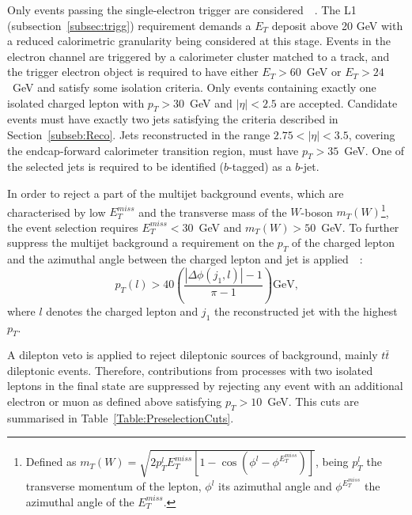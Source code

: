 Only events passing the single-electron trigger are considered~\cite{Aad:2014sca}~\cite{Aaboud:2016ymp}. The L1 (subsection~\ref{subsec:trigg}) requirement demands a $E_T$ deposit above 20 GeV with a reduced calorimetric granularity being considered at this stage. Events in the electron channel are triggered by a calorimeter cluster matched to a track, and the trigger electron object is required to have either $E_T >60$~GeV or $E_T >24$~GeV and satisfy some isolation criteria. Only events containing exactly one isolated charged lepton with $p_T > 30$~GeV and $|\eta|<2.5$ are accepted. Candidate events must have exactly two jets satisfying the criteria described in Section~\ref{subseb:Reco}. Jets reconstructed in the range $2.75<|\eta|<3.5$, covering the endcap-forward calorimeter transition region, must have $p_T > 35$~GeV. One of the selected jets is required to be identified ($b$-tagged) as a $b$-jet.



In order to reject a part of the multijet background events, which are characterised by low $E_T^{miss}$ and the transverse mass of the $W$-boson $m_{T}(W)$\footnote{Defined as $m_{T}(W)=\sqrt{2p_T^l E_T^{miss} [1-\cos(\phi^l - \phi^{E_T^{miss}})]}$, being $p_T^l$ the transverse momentum of the lepton, $\phi^l$ its azimuthal angle and $\phi^{E^{miss}_T}$ the azimuthal angle of the $E_T^{miss}$.}, the event selection requires $E_T^{miss}<30$~GeV and $m_{T}(W) > 50$~GeV. To further suppress the multijet background a requirement on the $p_T$ of the charged lepton and the azimuthal angle between the charged lepton and jet is applied~\cite{Aaboud:2016ymp}~\cite{Aad:2014fwa}:
\begin{equation*}
p_T(l) > 40\left(\frac{|\Delta \phi(j_1, l)|-1}{\pi -1} \right) \text{GeV,}
\end{equation*}
where $l$ denotes the charged lepton and $j_1$ the reconstructed jet with the highest $p_T$.


A dilepton veto is applied to reject dileptonic sources of background, mainly $t\bar{t}$ dileptonic events. Therefore, contributions from processes with two isolated leptons in the final state are suppressed by rejecting any event with an additional electron or muon as defined above satisfying $p_T > 10$~GeV. This cuts are summarised in Table~\ref{Table:PreselectionCuts}.





